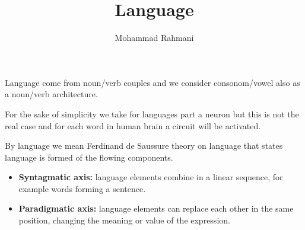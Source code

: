 \documentclass[a4paper]{article}
\title{Language}
\date{}
\author{Mohammad Rahmani}
\begin{document}
    \maketitle
    Language come from noun/verb couples and we consider consonom/vowel also as a noun/verb architecture.
    
    For the sake of simplicity we take for languages part a neuron but this is not the real case and for each word in human brain a circuit will be activated.
    
    By language we mean Ferdinand de Saussure theory on language that states language is formed of the flowing components.
    \begin{itemize}
        \item \textbf{Syntagmatic axis:} language elements combine in a linear sequence, for example words forming a sentence.
        \item \textbf{Paradigmatic axis:} language elements can replace each other in the same position, changing the meaning or value of the expression.
    \end{itemize}
    
    
\end{document}
